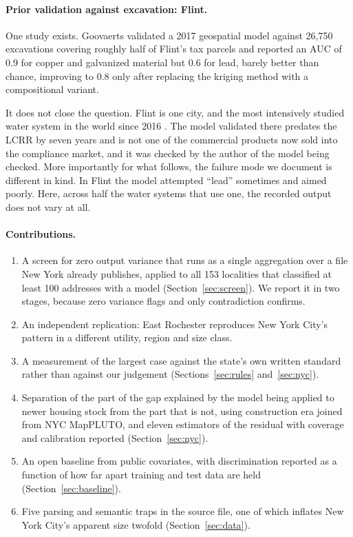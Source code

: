 \documentclass[11pt]{article}
\begin{document}
\paragraph{Prior validation against excavation: Flint.}
One study exists. Goovaerts \cite{goovaerts2023} validated a 2017
geospatial model against 26,750 excavations covering roughly half of Flint's tax parcels and
reported an AUC of 0.9 for copper and galvanized material but 0.6 for lead, barely better
than chance, improving to 0.8 only after replacing the kriging method with a compositional
variant.

It does not close the question. Flint is one city, and the most intensively studied water
system in the world since 2016 \cite{chojnacki2017,abernethy2018}. The model validated there
predates the LCRR by seven years and is not one of the commercial products now sold into the
compliance market, and it was checked by the author of the model being checked. More
importantly for what follows, the failure mode we document is different in kind. In Flint the
model attempted ``lead'' sometimes and aimed poorly. Here, across half the water systems that
use one, the recorded output does not vary at all.

\paragraph{Contributions.}
\begin{enumerate}\itemsep2pt
\item A screen for zero output variance that runs as a single aggregation over a file New
      York already publishes, applied to all 153 localities that classified at least 100
      addresses with a model (Section~\ref{sec:screen}). We report it in two stages, because
      zero variance flags and only contradiction confirms.
\item An independent replication: East Rochester reproduces New York City's pattern in a
      different utility, region and size class.
\item A measurement of the largest case against the state's own written standard rather than
      against our judgement (Sections~\ref{sec:rules} and~\ref{sec:nyc}).
\item Separation of the part of the gap explained by the model being applied to newer housing
      stock from the part that is not, using construction era joined from NYC MapPLUTO, and
      eleven estimators of the residual with coverage and calibration reported
      (Section~\ref{sec:nyc}).
\item An open baseline from public covariates, with discrimination reported as a function of
      how far apart training and test data are held (Section~\ref{sec:baseline}).
\item Five parsing and semantic traps in the source file, one of which inflates New York
      City's apparent size twofold (Section~\ref{sec:data}).
\end{enumerate}
\end{document}
